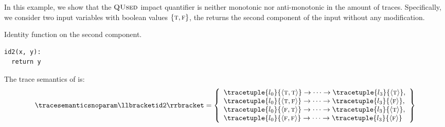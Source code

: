 \begin{example}
In this example, we show that the $\textup{\textsc{QUsed}}$ impact quantifier is neither monotonic nor anti-monotonic in the amount of traces.
Specifically, we consider two input variables with boolean values $\{\textsc{t}, \textsc{f}\}$, the  returns the second component of the input without any modification.
\begin{marginlisting}
  \caption{Identity function on the second component.}
  \vspace{25pt}
\begin{lstlisting}[style=mystyle,language=customPython]
id2(x, y):
  return y
 \end{lstlisting}
\end{marginlisting}
The trace semantics of  is:
\begin{align*}
  \tracesemanticsnoparam\semanticsof{\texttt{id2}}
  =
  \left\{
    \begin{array}{l}
      \tracetuple{\locinit}{\langle \true, \true\rangle}\tracearrow\tracetuple{\loc{3}}{\langle \true\rangle}, \\
      \tracetuple{\locinit}{\langle \true, \false\rangle}\tracearrow\tracetuple{\loc{3}}{\langle \false\rangle}, \\
      \tracetuple{\locinit}{\langle \false, \true\rangle}\tracearrow\tracetuple{\loc{3}}{\langle \true\rangle}, \\
      \tracetuple{\locinit}{\langle \false, \false\rangle}\tracearrow\tracetuple{\loc{3}}{\langle \false\rangle}
    \end{array}
    \right\}
\end{align*}
\begin{marginfigure}
\end{marginfigure}
\end{example}
